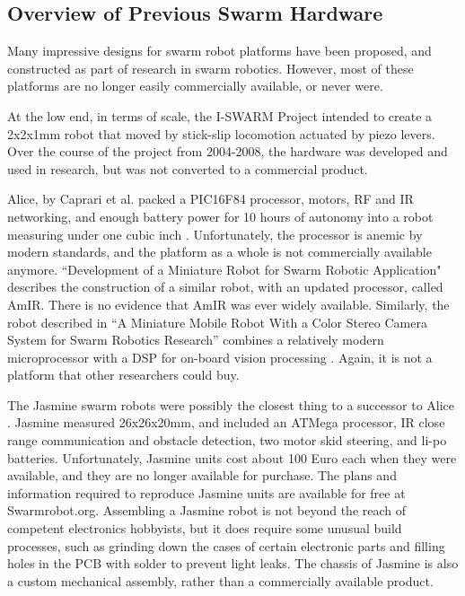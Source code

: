 \documentclass[]{article}
\begin{document}
\subsection{Overview of Previous Swarm Hardware}

Many impressive designs for swarm robot platforms have been proposed, and constructed as part of research in swarm robotics. 
However, most of these platforms are no longer easily commercially available, or never were. 

At the low end, in terms of scale, the I-SWARM Project intended to create a 2x2x1mm robot that moved by stick-slip locomotion actuated by piezo levers\cite{seyfried2005swarm}. 
Over the course of the project from 2004-2008, the hardware was developed and used in research, but was not converted to a commercial product. 

Alice, by Caprari et al. packed a PIC16F84 processor, motors, RF and IR networking, and enough battery power for 10 hours of autonomy into a robot measuring under one cubic inch \cite{caprari1998autonomous}. 
Unfortunately, the processor is anemic by modern standards, and the platform as a whole is not commercially available anymore. 
``Development of a Miniature Robot for Swarm Robotic Application" describes the construction of a similar robot, with an updated processor, called AmIR\cite{arvin2009development}. 
There is no evidence that AmIR was ever widely available.
Similarly, the robot described in ``A Miniature Mobile Robot With a Color Stereo Camera System for Swarm Robotics Research'' combines a relatively modern microprocessor with a DSP for on-board vision processing \cite{haverinen2005miniature}. 
Again, it is not a platform that other researchers could buy.

The Jasmine swarm robots were possibly the closest thing to a successor to Alice \cite{kernbach2011swarmrobot}.
Jasmine measured 26x26x20mm, and included an ATMega processor, IR close range communication and obstacle detection, two motor skid steering, and li-po batteries.
Unfortunately, Jasmine units cost about 100 Euro each when they were available, and they are no longer available for purchase. 
The plans and information required to reproduce Jasmine units are available for free at Swarmrobot.org.
Assembling a Jasmine robot is not beyond the reach of competent electronics hobbyists, but it does require some unusual build processes, such as grinding down the cases of certain electronic parts and filling holes in the PCB with solder to prevent light leaks. 
The chassis of Jasmine is also a custom mechanical assembly, rather than a commercially available product. 
\end{document}
